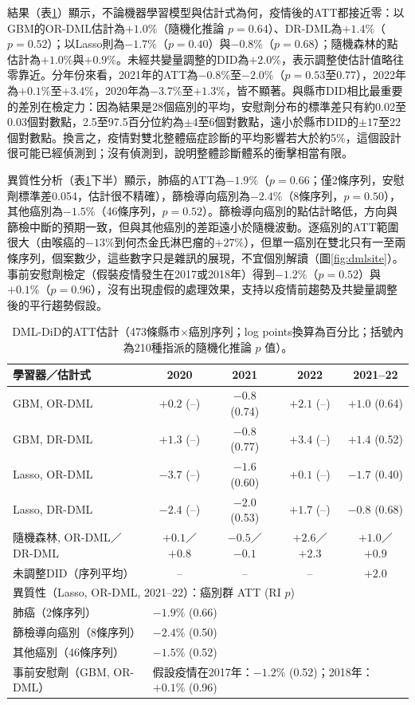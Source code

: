 \documentclass[UTF8,a4paper,11pt]{ctexart}
\begin{document}
結果（表\ref{tab:dml}）顯示，不論機器學習模型與估計式為何，疫情後的ATT都接近零：以GBM的OR-DML估計為$+1.0\%$（隨機化推論 $p=0.64$）、DR-DML為$+1.4\%$（$p=0.52$）；以Lasso則為$-1.7\%$（$p=0.40$）與$-0.8\%$（$p=0.68$）；隨機森林的點估計為$+1.0\%$與$+0.9\%$。未經共變量調整的DID為$+2.0\%$，表示調整使估計值略往零靠近。分年份來看，2021年的ATT為$-0.8\%$至$-2.0\%$（$p=0.53$至0.77），2022年為$+0.1\%$至$+3.4\%$，2020年為$-3.7\%$至$+1.3\%$，皆不顯著。與縣市DID相比最重要的差別在檢定力：因為結果是28個癌別的平均，安慰劑分布的標準差只有約0.02至0.03個對數點，2.5至97.5百分位約為$\pm 4$至$6$個對數點，遠小於縣市DID的$\pm 17$至22個對數點。換言之，疫情對雙北整體癌症診斷的平均影響若大於約5\%，這個設計很可能已經偵測到；沒有偵測到，說明整體診斷體系的衝擊相當有限。

異質性分析（表\ref{tab:dml}下半）顯示，肺癌的ATT為$-1.9\%$（$p=0.66$；僅2條序列，安慰劑標準差0.054，估計很不精確），篩檢導向癌別為$-2.4\%$（8條序列，$p=0.50$），其他癌別為$-1.5\%$（46條序列，$p=0.52$）。篩檢導向癌別的點估計略低，方向與篩檢中斷的預期一致，但與其他癌別的差距遠小於隨機波動。逐癌別的ATT範圍很大（由喉癌的$-13\%$到何杰金氏淋巴瘤的$+27\%$），但單一癌別在雙北只有一至兩條序列，個案數少，這些數字只是雜訊的展現，不宜個別解讀（圖\ref{fig:dmlsite}）。事前安慰劑檢定（假裝疫情發生在2017或2018年）得到$-1.2\%$（$p=0.52$）與$+0.1\%$（$p=0.96$），沒有出現虛假的處理效果，支持以疫情前趨勢及共變量調整後的平行趨勢假設。

\begin{table}[H]
\centering
\caption{DML-DiD的ATT估計（473條縣市$\times$癌別序列；log points換算為百分比；括號內為210種指派的隨機化推論 $p$ 值）。}\label{tab:dml}
\small
\begin{tabular}{lcccc}
\toprule
學習器／估計式 & 2020 & 2021 & 2022 & 2021--22\\
\midrule
GBM, OR-DML & $+0.2$ (--) & $-0.8$ (0.74) & $+2.1$ (--) & $+1.0$ (0.64)\\
GBM, DR-DML & $+1.3$ (--) & $-0.8$ (0.77) & $+3.4$ (--) & $+1.4$ (0.52)\\
Lasso, OR-DML & $-3.7$ (--) & $-1.6$ (0.60) & $+0.1$ (--) & $-1.7$ (0.40)\\
Lasso, DR-DML & $-2.4$ (--) & $-2.0$ (0.53) & $+1.7$ (--) & $-0.8$ (0.68)\\
隨機森林, OR-DML／DR-DML & $+0.1$／$+0.8$ & $-0.5$／$-0.1$ & $+2.6$／$+2.3$ & $+1.0$／$+0.9$\\
未調整DID（序列平均） & -- & -- & -- & $+2.0$\\
\midrule
\multicolumn{5}{l}{異質性（Lasso, OR-DML, 2021--22）：癌別群 ATT (RI $p$)}\\
肺癌（2條序列） & \multicolumn{4}{l}{$-1.9\%$ (0.66)}\\
篩檢導向癌別（8條序列） & \multicolumn{4}{l}{$-2.4\%$ (0.50)}\\
其他癌別（46條序列） & \multicolumn{4}{l}{$-1.5\%$ (0.52)}\\
事前安慰劑（GBM, OR-DML） & \multicolumn{4}{l}{假設疫情在2017年：$-1.2\%$ (0.52)；2018年：$+0.1\%$ (0.96)}\\
\bottomrule
\end{tabular}
\end{table}
\end{document}
